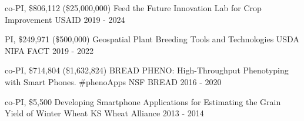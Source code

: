 \begin{cvgrants}
  \cvgrant
    {co-PI, \$806,112 (\$25,000,000)}
    {Feed the Future Innovation Lab for Crop Improvement}
    {USAID} %
    {2019 - 2024}
    {
    }

  \cvgrant
    {PI, \$249,971 (\$500,000)} %
    {Geospatial Plant Breeding Tools and Technologies}
    {USDA NIFA FACT} %
    {2019 - 2022}
    {
    }

  \cvgrant
    {co-PI, \$714,804 (\$1,632,824)} %
    {BREAD PHENO: High-Throughput Phenotyping with Smart Phones. \#phenoApps}
    {NSF BREAD} %
    {2016 - 2020}
    {
    }

  \cvgrant
    {co-PI, \$5,500} %
    {Developing Smartphone Applications for Estimating the Grain Yield of Winter Wheat}
    {KS Wheat Alliance}
    {2013 - 2014}
    {
    }

\end{cvgrants}
